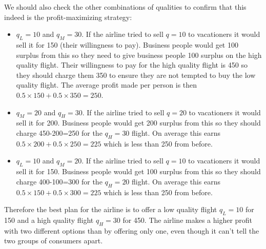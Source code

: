 \documentclass[12pt]{article}
\newcounter{question}[section]
\newcommand{\question}[1]{\refstepcounter{question}
  \subsubsection*{Question~\thequestion~-- #1}}
\newenvironment{subquestions}{
  \begin{enumerate}[label=(\roman*)]}{\end{enumerate}}
\begin{document}
\begin{subquestions}
      \textcolor{solution-color}{
        We should also check the other combinations of qualities to confirm that this indeed is the profit-maximizing strategy:
        \begin{itemize}
          \item $q_L=10$ and $q_M=30$. If the airline tried to sell $q=10$ to vacationers it would sell it for 150 (their willingness to pay). Business people would get 100 surplus from this so they need to give business people 100 surplus on the high quality flight. Their willingness to pay for the high quality flight is 450 so they should charge them 350 to ensure they are not tempted to buy the low quality flight. The average profit made per person is then $0.5\times 150+0.5 \times 350=250$. 
          \item $q_M=20$ and $q_H=30$. If the airline tried to sell $q=20$ to vacationers it would sell it for 200. Business people would get 200 surplus from this so they should charge 450-200=250 for the $q_H=30$ flight. On average this earns $0.5\times 200 + 0.5 \times 250=225$ which is less than 250 from before.
          \item $q_L=10$ and $q_M=20$. If the airline tried to sell $q=10$ to vacationers it would sell it for 150. Business people would get 100 surplus from this so they should charge 400-100=300 for the $q_H=20$ flight. On average this earns $0.5\times 150 + 0.5 \times 300=225$ which is less than 250 from before.
        \end{itemize}
        Therefore the best plan for the airline is to offer a low quality flight $q_L=10$ for 150 and a high quality flight $q_H=30$ for 450. The airline makes a higher profit with two different options than by offering only one, even though it can't tell the two groups of consumers apart.
      }
\end{subquestions}
\end{document}
